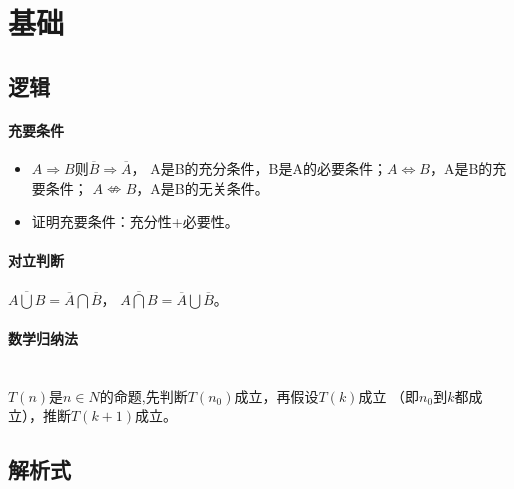 \documentclass[
12pt, %
a4paper, 
oneside, %
headinclude,footinclude, %
]{scrartcl}
\title{\normalfont\spacedallcaps{数学}}
\date{}
\begin{document}
\maketitle
\newpage
\hypertarget{toc}{}
\begingroup
\begin{multicols}{2}
\tableofcontents
\end{multicols}
\endgroup
\newpage
\listoftips
\newpage
\section{基础}
\subsection[逻辑]{逻辑}
\paragraph{充要条件}
\begin{itemize}
\item $ A \Rightarrow B $则$ \overline{B} \Rightarrow \overline{A} $，
A是B的充分条件，B是A的必要条件；$ A \Leftrightarrow B $，A是B的充要条件；
$ A \nLeftrightarrow  B $，A是B的无关条件。
\item 证明充要条件：充分性+必要性。
\end{itemize}
\paragraph{对立判断}
$ \overline{A \bigcup B} = \overline{A} \bigcap \overline{B}$，
$ \overline{A \bigcap B} = \overline{A} \bigcup \overline{B}$。
\paragraph{数学归纳法}~\\

$ T(n) $是$ n \in N $的命题,先判断$ T(n_0) $成立，再假设$ T(k) $成立
（即$ n_0 $到$ k $都成立），推断$ T(k+1) $成立。
\subsection[解析式]{解析式}
\end{document}
